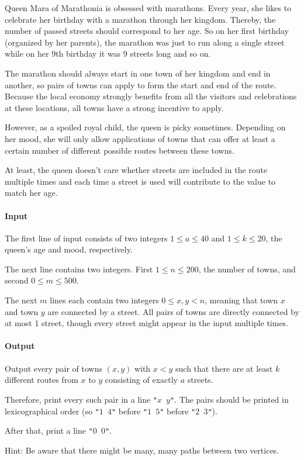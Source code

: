 




Queen Mara of Marathonia is obsessed with marathons. Every year, she likes to celebrate her birthday with a marathon through her kingdom. Thereby, the number of passed streets should correspond to her age. So on her first birthday (organized by her parents), the marathon was just to run along a single street while on her 9th birthday it was 9 streets long and so on.

The marathon should always start in one town of her kingdom and end in another, so pairs of towns can apply to form the start and end of the route. Because the local economy strongly benefits from all the visitors and celebrations at these locations, all towns have a strong incentive to apply.

However, as a spoiled royal child, the queen is picky sometimes. Depending on her mood, she will only allow applications of towns that can offer at least a certain number of different possible routes between these towns.

At least, the queen doesn't care whether streets are included in the route multiple times and each time a street is used will contribute to the value to match her age.

\paragraph*{Input}

The first line of input consists of two integers \(1\le a \le 40\) and \(1\le k \le 20\), the queen's age and mood, respectively.

The next line contains two integers. First \(1 \le n \le 200\), the number of towns, and second \(0\le m \le 500\). 

The next \(m\) lines each contain two integers \(0 \le x,y < n\), meaning that town \(x\) and town \(y\) are connected by a street. All pairs of towns are directly connected by at most 1 street, though every street might appear in the input multiple times.

\paragraph*{Output}
Output every pair of towns \((x,y)\) with \(x < y\) such that there are at least \(k\) different routes from \(x\) to \(y\) consisting of exactly \(a\) streets.

Therefore, print every such pair in a line \texttt{"\(x\) \(y\)"}. The pairs should be printed in lexicographical order (so \texttt{"\(1\) \(4\)"} before \texttt{"\(1\) \(5\)"} before \texttt{"\(2\) \(3\)"}).

After that, print a line \texttt{"\(0\) \(0\)"}.

Hint: Be aware that there might be many, many paths between two vertices.

\begin{samples}
\end{samples}

